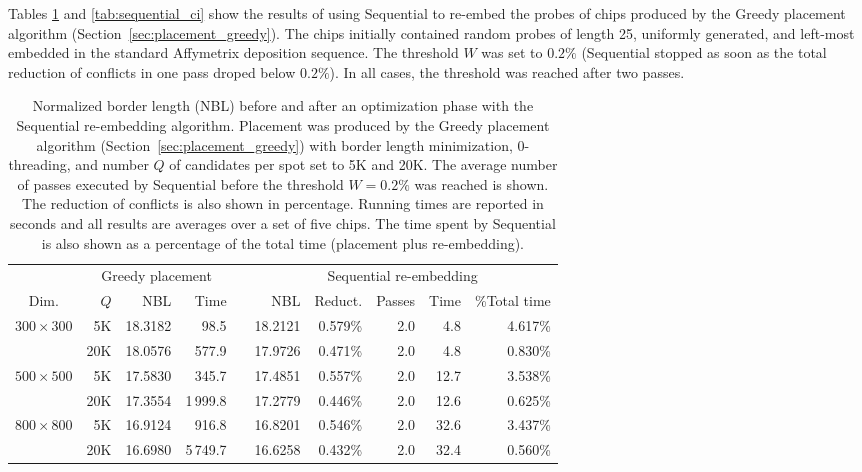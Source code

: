 Tables \ref{tab:sequential_bl} and \ref{tab:sequential_ci} show the results of
using Sequential to re-embed the probes of chips produced by the Greedy
placement algorithm (Section~\ref{sec:placement_greedy}). The chips initially
contained random probes of length 25, uniformly generated, and left-most
embedded in the standard Affymetrix deposition sequence.
The threshold $W$ was set to $0.2\%$ (Sequential stopped as soon as the total
reduction of conflicts in one pass droped below $0.2\%$). In all cases, the
threshold was reached after two passes.

\begin{table}[t]\centering
\caption{\label{tab:sequential_bl}
  Normalized border length (NBL) before and after an optimization phase with the
  Sequential re-embedding algorithm. Placement was produced by the Greedy
  placement algorithm (Section~\ref{sec:placement_greedy}) with border length
  minimization, $0$-threading, and number $Q$ of candidates per spot set to 5K
  and 20K. The average number of passes executed by Sequential before the
  threshold $W=0.2\%$ was reached is shown. The reduction of conflicts is also
  shown in percentage. Running times are reported in seconds and all results are
  averages over a set of five chips. The time spent by Sequential is also shown
  as a percentage of the total time (placement plus re-embedding).}
\footnotesize{
\begin{tabular}{crrrlrrrrr}
\vspace{1pt}
     & \multicolumn{3}{c}{Greedy placement} & & \multicolumn{5}{c}{Sequential re-embedding} \\ \cline{2-4} \cline{6-10}
\vspace{1pt}
Dim. & $Q$ & NBL & Time & & NBL & Reduct. & Passes & Time & \%Total time \\
\hline
$300\times 300$ &  5K & 18.3182 &     98.5 & & 18.2121 & 0.579\% & 2.0 &  4.8 & 4.617\% \\
                & 20K & 18.0576 &    577.9 & & 17.9726 & 0.471\% & 2.0 &  4.8 & 0.830\% \\
\hline
$500\times 500$ &  5K & 17.5830 &    345.7 & & 17.4851 & 0.557\% & 2.0 & 12.7 & 3.538\% \\
                & 20K & 17.3554 & 1\,999.8 & & 17.2779 & 0.446\% & 2.0 & 12.6 & 0.625\% \\
\hline
$800\times 800$ &  5K & 16.9124 &    916.8 & & 16.8201 & 0.546\% & 2.0 & 32.6 & 3.437\% \\
                & 20K & 16.6980 & 5\,749.7 & & 16.6258 & 0.432\% & 2.0 & 32.4 & 0.560\% \\
\hline
\end{tabular}}
\end{table}

